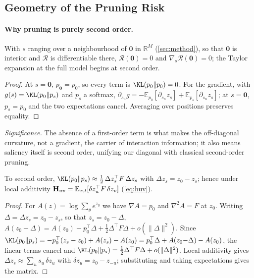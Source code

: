 \subsection{Geometry of the Pruning Risk}

\label{app:th-geom}
\paragraph{Why pruning is purely second order.}
\begin{proposition}\label{prop:vanish}
With $s$ ranging over a neighbourhood of $\mathbf 0$ in $\mathbb{R}^M$ (\cref{sec:method}), so that
$\mathbf 0$ is interior and $\mathcal{R}$ is differentiable there,
$\mathcal{R}(\mathbf 0)=0$ and $\nabla_s\mathcal{R}(\mathbf 0)=0$; the Taylor expansion at the full model
begins at second order.
\end{proposition}
\begin{proof}
At $s=\mathbf 0$, $p_{\mathbf 0}=p_0$, so every term is $\KL(p_0\|p_0)=0$. For the gradient, with
$g(s)=\KL(p_0\|p_s)$ and $p_s$ a softmax,
$\partial_{s_u}g=-\mathbb{E}_{p_0}[\partial_{s_u}z_s]+\mathbb{E}_{p_s}[\partial_{s_u}z_s]$; at
$s=\mathbf 0$, $p_s=p_0$ and the two expectations cancel. Averaging over positions preserves equality.
\end{proof}
\noindent\emph{Significance.} The absence of a first-order term is what makes the off-diagonal
curvature, not a gradient, the carrier of interaction information; it also means saliency itself
is second order, unifying our diagonal with classical second-order pruning.

\begin{proposition}\label{prop:fisher}
To second order, $\KL(p_0\|p_s)\approx\tfrac12\,\Delta z_s^\top F\,\Delta z_s$ with
$\Delta z_s=z_0-z_s$; hence under local additivity
$\mathbf{H}_{uv}=\mathbb{E}_{x,t}[\delta z_u^\top F\,\delta z_v]$ (\cref{eq:huv}).
\end{proposition}
\begin{proof}
For $A(z)=\log\sum_y e^{z_y}$ we have $\nabla A=p_0$ and $\nabla^2A=F$ at $z_0$. Writing
$\Delta=\Delta z_s=z_0-z_s$, so that $z_s=z_0-\Delta$,
$A(z_0{-}\Delta)=A(z_0)-p_0^\top\Delta+\tfrac12\Delta^\top F\Delta+o(\|\Delta\|^2)$. Since
$\KL(p_0\|p_s)=-p_0^\top(z_s-z_0)+A(z_s)-A(z_0)=p_0^\top\Delta+A(z_0{-}\Delta)-A(z_0)$, the linear terms
cancel and $\KL(p_0\|p_s)=\tfrac12\Delta^\top F\Delta+o(\|\Delta\|^2)$. Local additivity gives
$\Delta z_s\approx\sum_u s_u\,\delta z_u$ with $\delta z_u=z_0-z_{-u}$; substituting and taking
expectations gives the matrix.
\end{proof}
